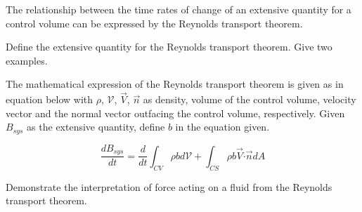 \clearpage		%
\question{}

\listbeginx	%

	\item The relationship between the time rates of change of an extensive quantity for a control volume can be expressed by the Reynolds transport theorem.  
	
		
		\listbegin

\item Define the extensive quantity for the Reynolds transport theorem. Give two examples.

		

\item The mathematical expression of the Reynolds transport theorem is given as in equation below with $\rho$, $\mathcal{V}$, $\overrightarrow{V}$, $\overrightarrow{n}$ as density, volume of the control volume, velocity vector and the normal vector outfacing the control volume, respectively. Given $B_{sys}$ as the extensive quantity, define $b$ in the equation given.
  
\begin{center}
\begin{equation}
\nonumber
\frac{dB_{sys}}{dt} = \frac{d}{dt}\int_{CV} \rho bd\mathcal{V} + \int_{CS} \rho b \overrightarrow{V} \boldsymbol{\cdot} \overrightarrow{n} dA
\end{equation}
\end{center}


	\item Demonstrate the interpretation of force acting on a fluid from the Reynolds transport theorem.	
	
